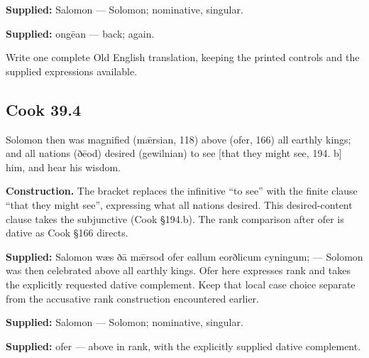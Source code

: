 \textbf{Supplied:} Salomon — Solomon; nominative, singular.

\textbf{Supplied:} ongēan — back; again.

Write one complete Old English translation, keeping the printed controls and the supplied expressions available.

\par\begin{minipage}{\linewidth}\raggedright
\subsection*{Cook 39.4}

Solomon then was magnified (mǣrsian, 118) above (ofer, 166) all earthly kings; and all nations (ðēod) desired (gewilnian) to see [that they might see, 194. b] him, and hear his wisdom.

\end{minipage}\par\addvspace{4pt}

\textbf{Construction.} The bracket replaces the infinitive “to see” with the finite clause “that they might see”, expressing what all nations desired. This desired-content clause takes the subjunctive (Cook §194.b). The rank comparison after ofer is dative as Cook §166 directs.

\textbf{Supplied:} Salomon wæs ðā mǣrsod ofer eallum eorðlicum cyningum; — Solomon was then celebrated above all earthly kings. Ofer here expresses rank and takes the explicitly requested dative complement. Keep that local case choice separate from the accusative rank construction encountered earlier.

\textbf{Supplied:} Salomon — Solomon; nominative, singular.

\textbf{Supplied:} ofer — above in rank, with the explicitly supplied dative complement.

